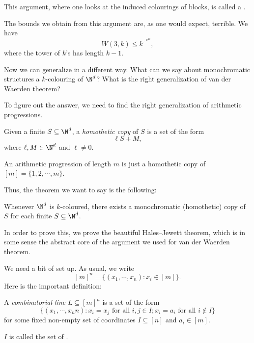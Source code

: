 \documentclass[a4paper]{article}
\begin{document}
This argument, where one looks at the induced colourings of blocks, is called a .

The bounds we obtain from this argument are, as one would expect, terrible. We have
\[
  W(3, k) \leq k^{\iddots^{k^{4k}}},
\]
where the tower of $k$'s has length $k - 1$.

Now we can generalize in a different way. What can we say about monochromatic structures a $k$-colouring of $\N^d$? What is the right generalization of van der Waerden theorem?

To figure out the answer, we need to find the right generalization of arithmetic progressions.

\begin{defi}
  Given a finite $S \subseteq \N^d$, a \emph{homothetic copy} of $S$ is a set of the form
  \[
    \ell S + M,
  \]
  where $\ell, M \in \N^d$ and $\ell \not= 0$.
\end{defi}

\begin{eg}
  An arithmetic progression of length $m$ is just a homothetic copy of $[m] = \{1, 2, \cdots, m\}$.
\end{eg}

Thus, the theorem we want to say is the following:
\begin{thm}[Gallai]
  Whenever $\N^d$ is $k$-coloured, there exists a monochromatic (homothetic) copy of $S$ for each finite $S \subseteq \N^d$.
\end{thm}

In order to prove this, we prove the beautiful Hales--Jewett theorem, which is in some sense the abstract core of the argument we used for van der Waerden theorem.

We need a bit of set up. As usual, we write
\[
  [m]^n = \{(x_1, \cdots, x_n): x_i \in [m]\}.
\]
Here is the important definition:
\begin{defi}
  A \emph{combinatorial line} $L \subseteq [m]^n$ is a set of the form
  \[
    \{(x_1, \cdots, x_nn): x_i = x_j\text{ for all }i, j \in I; x_i = a_i\text{ for all }i \not\in I\}
  \]
  for some fixed non-empty set of coordinates $I \subseteq [n]$ and $a_i \in [m]$.

  $I$ is called the set of .
\end{defi}
\end{document}
